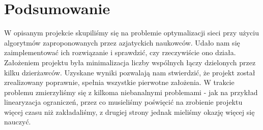 \section{Podsumowanie}
W opisanym projekcie skupiliśmy się na problemie optymalizacji sieci przy użyciu algorytmów zaproponowanych
przez azjatyckich naukowców. Udało nam się zaimplementować ich rozwiązanie i sprawdzić, czy rzeczywiście ono
działa. Założeniem projektu była minimalizacja liczby wspólnych łączy dzielonych przez kilku dzierżawców. Uzyskane
wyniki pozwalają nam stwierdzić, że projekt został zrealizowany poprawnie, spełnia wszystkie pierwotne założenia.
W trakcie problemu zmierzyliśmy się z kilkoma niebanalnymi problemami - jak na przykład linearyzacja ograniczeń,
przez co musieliśmy poświęcić na zrobienie projektu więcej czasu niż zakładaliśmy, z drugiej strony jednak mieliśmy
okazję więcej się nauczyć.

